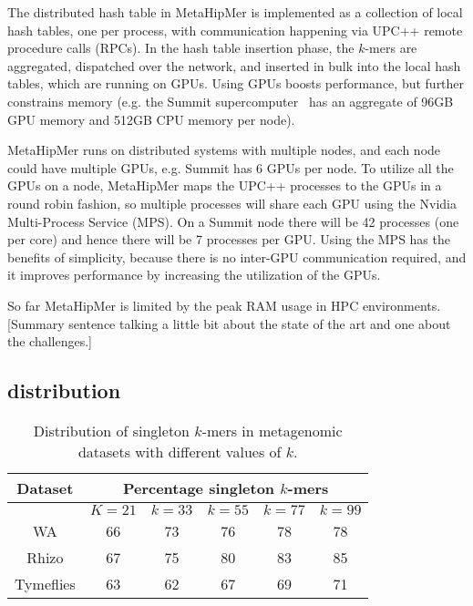 The distributed hash table in MetaHipMer is implemented as a collection of local
hash tables, one per process, with communication happening via UPC++ remote
procedure calls (RPCs). In the hash table insertion phase, the $k$-mers are
aggregated, dispatched over the network, and inserted in bulk into the local
hash tables, which are running on GPUs. Using GPUs boosts performance, but
further constrains memory (e.g. the Summit supercomputer~\cite{VazhkudaiDBG18}
has an aggregate of 96GB GPU memory and 512GB CPU memory per node).

MetaHipMer runs on distributed systems with multiple nodes, and each node could
have multiple GPUs, e.g. Summit has 6 GPUs per node. To utilize all the GPUs on
a node, MetaHipMer maps the UPC++ processes to the GPUs in a round robin
fashion, so multiple processes will share each GPU using the Nvidia
Multi-Process Service (MPS). On a Summit node there will be 42 processes (one
per core) and hence there will be 7 processes per GPU\@. Using the MPS has the
benefits of simplicity, because there is no inter-GPU communication required,
and it improves performance by increasing the utilization of the GPUs.

\begin{rproblem}
So far MetaHipMer is limited by the peak RAM usage in HPC environments.
[Summary sentence talking a little bit about the state of the art and one about the challenges.]
\label{rprob:peppermint}
\end{rproblem}



\subsection{\Kmer distribution}

\begin{wraptable}{r}{4.5in}
\centering
    \begin{tabular}{c | c | c | c | c | c}
    \toprule
    {\bf Dataset} & \multicolumn{5}{c}{\bf Percentage singleton $k$-mers} \\
    \midrule
    & $K=21$ & $k=33$ & $k=55$ & $k=77$ & $k=99$ \\
    \midrule
    WA &  66 & 73 & 76 & 78 & 78  \\
    Rhizo &  67 & 75 & 80 & 83 & 85  \\
    Tymeflies & 63 & 62 & 67 & 69 & 71 \\
    \bottomrule
    \end{tabular}
    \caption{Distribution of singleton $k$-mers in metagenomic datasets with different values of $k$.}
    \label{tab:kmer-dist}
\end{wraptable}


